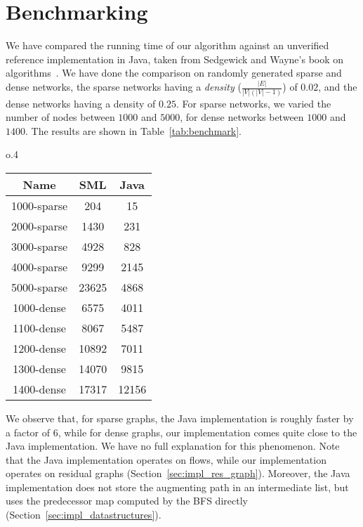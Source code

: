 \documentclass{llncs}
\begin{document}
\section{Benchmarking}
  We have compared the running time of our algorithm against an unverified reference implementation in Java, taken from Sedgewick and Wayne's book on algorithms~\cite{SeWa11}.
  We have done the comparison on randomly generated sparse and dense networks, the sparse networks having a \emph{density} ($\frac{|E|}{|V|(|V| - 1)}$) of $0.02$, and the dense networks having a density of $0.25$. For sparse networks, we varied the number of nodes between $1000$ and $5000$, for dense networks between $1000$ and $1400$.
  The results are shown in Table~\ref{tab:benchmark}. 
  \begin{wrapfigure}{o}{.4\textwidth}
  \vspace{-20pt}
  \begin{center}
  \begin{tabular}{|c|c|c|}
  \hline
  Name        & SML       & Java   \\
  \hline\hline
  1000-sparse & 204       & 15     \\
  2000-sparse & 1430      & 231    \\
  3000-sparse & 4928      & 828    \\
  4000-sparse & 9299      & 2145   \\
  5000-sparse & 23625     & 4868   \\
  1000-dense  & 6575      & 4011   \\
  1100-dense  & 8067      & 5487   \\
  1200-dense  & 10892     & 7011   \\
  1300-dense  & 14070     & 9815   \\
  1400-dense  & 17317     & 12156  \\
  \hline
  \end{tabular}
  \end{center}
  \vspace{-15pt}
  \caption{Dijkstra benchmark}\label{tab:benchmark}
  \vspace{-20pt}
  \end{wrapfigure}
  
  We observe that, for sparse graphs, the Java implementation is roughly faster by a factor of 6, while for dense graphs, our implementation comes quite close 
  to the Java implementation. We have no full explanation for this phenomenon. Note that the Java implementation operates on flows, while our implementation 
  operates on residual graphs (\cf Section~\ref{sec:impl_res_graph}). Moreover, the Java implementation does not store the augmenting 
  path in an intermediate list, but uses the predecessor map computed by the BFS directly (\cf Section~\ref{sec:impl_datastructures}).
\end{document}

